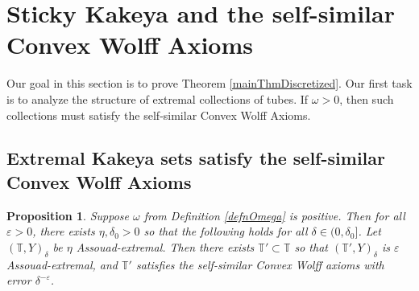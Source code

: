 \documentclass[letterpaper, reqno,11pt]{article}
\numberwithin{equation}{section}
\newcommand{\eps}{\varepsilon}
\newcommand{\tubes}{\mathbb{T}}
\numberwithin{thm}{section}
\newtheorem{prop}[thm]{Proposition}
\theoremstyle{remark}
\begin{document}

\section{Sticky Kakeya and the self-similar Convex Wolff Axioms }\label{kakeyaSelfSimWolffSection}
Our goal in this section is to prove Theorem \ref{mainThmDiscretized}. Our first task is to analyze the structure of extremal collections of tubes. If $\omega>0$, then such collections must satisfy the self-similar Convex Wolff Axioms. 

\subsection{Extremal Kakeya sets satisfy the self-similar Convex Wolff Axioms}\label{extremalImpliesSelfSimilarWolffSection}
\begin{prop}\label{extremalImpliesSelfSimilarWolff}
Suppose $\omega$ from Definition \ref{defnOmega} is positive. Then for all $\eps>0$, there exists $\eta,\delta_0>0$ so that the following holds for all $\delta\in(0,\delta_0]$. Let $(\tubes,Y)_\delta$ be $\eta$ Assouad-extremal. Then there exists $\tubes'\subset\tubes$ so that $(\tubes',Y)_\delta$ is $\eps$ Assouad-extremal, and $\tubes'$ satisfies the self-similar Convex Wolff axioms with error $\delta^{-\eps}$. 
\end{prop}
\end{document}
